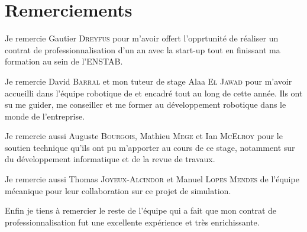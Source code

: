 
\section*{Remerciements}

Je remercie Gautier \textsc{Dreyfus} pour m'avoir offert l'opprtunité de réaliser un contrat de professionnalisation d'un an avec la start-up \forssea{} tout en finissant ma formation au sein de l'\gls{ENSTAB}.

Je remercie David \textsc{Barral} et mon tuteur de stage Alaa \textsc{El Jawad} pour m'avoir accueilli dans l'équipe robotique de \forssea{} et encadré tout au long de cette année. Ils ont su me guider, me conseiller et me former au développement robotique dans le monde de l'entreprise.

Je remercie aussi Auguste \textsc{Bourgois}, Mathieu \textsc{Mege} et Ian \textsc{McElroy} pour le soutien technique qu'ils ont pu m'apporter au cours de ce stage, notamment sur du développement informatique et de la revue de travaux.

Je remercie aussi Thomas \textsc{Joyeux-Alcindor} et Manuel \textsc{Lopes Mendes} de l'équipe mécanique pour leur collaboration sur ce projet de simulation.

Enfin je tiens à remercier le reste de l'équipe \forssea{} qui a fait que mon contrat de professionnalisation fut une excellente expérience et très enrichissante.